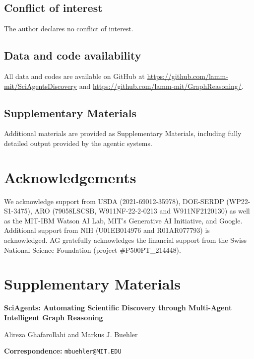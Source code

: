 \documentclass{article}
\begin{document}
\subsection*{Conflict of interest}
The author declares no conflict of interest.

\subsection*{Data and code availability}
All data and codes are available on GitHub at \url{https://github.com/lamm-mit/SciAgentsDiscovery} and \url{https://github.com/lamm-mit/GraphReasoning/}. 

\subsection*{Supplementary Materials}
Additional materials are provided as Supplementary Materials, including fully detailed output provided by the agentic systems. 

\section*{Acknowledgements}
We acknowledge support from USDA (2021-69012-35978), DOE-SERDP (WP22-S1-3475), ARO (79058LSCSB, W911NF-22-2-0213 and W911NF2120130) as well as the MIT-IBM Watson AI Lab, MIT’s Generative AI Initiative, and Google. Additional support from NIH (U01EB014976 and R01AR077793) is acknowledged. AG gratefully acknowledges the financial support from the Swiss National Science Foundation (project \#P500PT\_214448).


%  

  


\newpage
\appendix

\pagestyle{empty} 

\renewcommand{\thefigure}{S\arabic{figure}}
\setcounter{figure}{0} %
\renewcommand{\thetable}{S\arabic{table}}
\setcounter{table}{0} %

\clearpage
\begin{center}
\LARGE\bfseries \section*{Supplementary Materials}
\vspace{2cm}

\LARGE\bfseries SciAgents: Automating Scientific Discovery through Multi-Agent Intelligent Graph Reasoning
\vspace{1cm}

\end{center}
\begin{center}

Alireza Ghafarollahi and Markus J. Buehler


\vspace{1cm}
\noindent \textbf{Correspondence:} \texttt{mbuehler@MIT.EDU}
\end{center}
\end{document}
